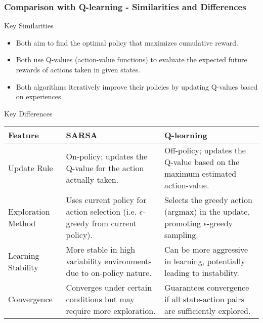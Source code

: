 \documentclass{beamer}
\begin{document}
\begin{frame}[fragile]
    \frametitle{Comparison with Q-learning - Similarities and Differences}
    \begin{block}{Key Similarities}
        \begin{itemize}
            \item Both aim to find the optimal policy that maximizes cumulative reward.
            \item Both use Q-values (action-value functions) to evaluate the expected future rewards of actions taken in given states.
            \item Both algorithms iteratively improve their policies by updating Q-values based on experiences.
        \end{itemize}
    \end{block}

    \begin{block}{Key Differences}
        \begin{tabular}{|l|l|l|}
            \hline
            Feature                     & SARSA                            & Q-learning                      \\ \hline
            Update Rule                 & On-policy; updates the Q-value for the action actually taken. & Off-policy; updates the Q-value based on the maximum estimated action-value. \\ \hline
            Exploration Method          & Uses current policy for action selection (i.e. $\epsilon$-greedy from current policy). & Selects the greedy action (argmax) in the update, promoting $\epsilon$-greedy sampling. \\ \hline
            Learning Stability           & More stable in high variability environments due to on-policy nature. & Can be more aggressive in learning, potentially leading to instability. \\ \hline
            Convergence                 & Converges under certain conditions but may require more exploration. & Guarantees convergence if all state-action pairs are sufficiently explored. \\ \hline
        \end{tabular}
    \end{block}
\end{frame}
\end{document}
